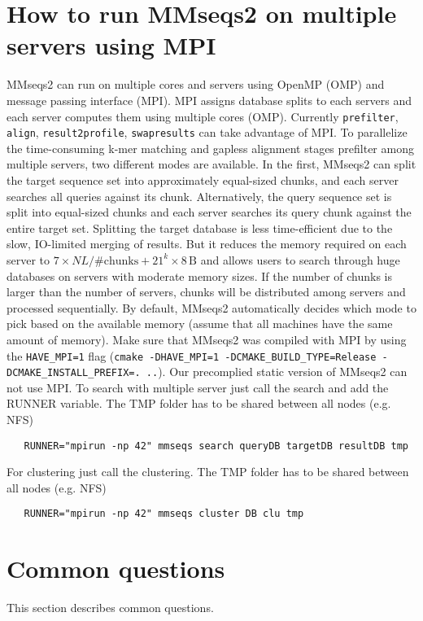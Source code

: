 \documentclass[11pt,a4paper]{scrreprt}
\begin{document}
\section{How to run MMseqs2 on multiple servers using MPI}
MMseqs2 can run on multiple cores and servers using OpenMP (OMP) and message passing interface (MPI). MPI assigns database splits to each servers and each server computes them using multiple cores (OMP). Currently \texttt{prefilter}, \texttt{align}, \texttt{result2profile}, \texttt{swapresults} can take advantage of MPI.
To parallelize the time-consuming k-mer matching and gapless alignment stages prefilter among multiple servers, two different modes are available. In the first, MMseqs2 can split the target sequence set into approximately equal-sized chunks, and each server searches all queries against its chunk. Alternatively, the query sequence set is split into equal-sized chunks and each server searches its query chunk against the entire target set. Splitting the target database is less time-efficient due to the slow, IO-limited merging of results. But it reduces the memory required on each server to  $7 \times NL / \text{\#chunks} + 21^k \times 8\,\mathrm{B}$
 and allows users to search through huge databases on servers with moderate memory sizes. If the number of chunks is larger than the number of servers, chunks will be distributed among servers and processed sequentially. By default, MMseqs2 automatically decides which mode to pick based on the available memory (assume that all machines have the same amount of memory).
Make sure that MMseqs2 was compiled with MPI by using the \texttt{HAVE\_MPI=1} flag (\texttt{cmake -DHAVE\_MPI=1 -DCMAKE\_BUILD\_TYPE=Release -DCMAKE\_INSTALL\_PREFIX=. ..}). Our precomplied static version of MMseqs2 can not use MPI.
To search with multiple server just call the search and add the RUNNER variable. The TMP folder has to be shared between all nodes (e.g. NFS)
\begin{verbatim}
   RUNNER="mpirun -np 42" mmseqs search queryDB targetDB resultDB tmp
\end{verbatim}

For clustering just call the clustering. The TMP folder has to be shared between all nodes (e.g. NFS)
\begin{verbatim}
   RUNNER="mpirun -np 42" mmseqs cluster DB clu tmp
\end{verbatim}

\section{Common questions}
This section describes common questions. 
\end{document}
